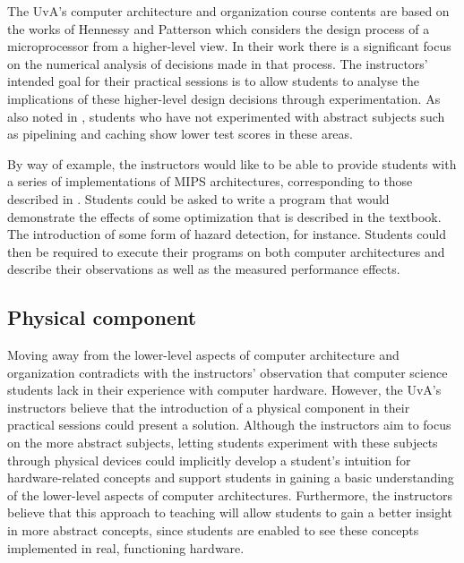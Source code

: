 \documentclass[singleside,openright]{uva-bachelor-thesis}
\begin{document}
The UvA's computer architecture and organization course contents are based on the works of Hennessy and Patterson \cite{hennessy2013computer} which considers the design process of a microprocessor from a higher-level view. In their work there is a significant focus on the numerical analysis of decisions made in that process. The instructors' intended goal for their practical sessions is to allow students to analyse the implications of these higher-level design decisions through experimentation. As also noted in \cite{paharsingh2009novel}, students who have not experimented with abstract subjects such as pipelining and caching show lower test scores in these areas. 

By way of example, the instructors would like to be able to provide students with a series of implementations of MIPS architectures, corresponding to those described in \cite[Ch. 4]{hennessy2013computer}. Students could be asked to write a program that would demonstrate the effects of some optimization that is described in the textbook. The introduction of some form of hazard detection, for instance. Students could then be required to execute their programs on both computer architectures and describe their observations as well as the measured performance effects. 



\subsection{Physical component}

Moving away from the lower-level aspects of computer architecture and organization contradicts with the instructors' observation that computer science students lack in their experience with computer hardware. However, the UvA's instructors believe that the introduction of a physical component in their practical sessions could present a solution. Although the instructors aim to focus on the more abstract subjects, letting students experiment with these subjects through physical devices could implicitly develop a student's intuition for hardware-related concepts and support students in gaining a basic understanding of the lower-level aspects of computer architectures. Furthermore, the instructors believe that this approach to teaching will allow students to gain a better insight in more abstract concepts, since students are enabled to see these concepts  implemented in real, functioning hardware.
\end{document}
